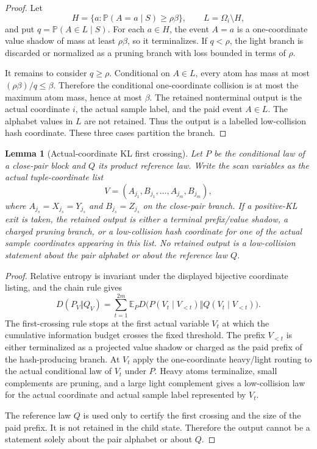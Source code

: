\documentclass[11pt]{article}
\newtheorem{lemma}[theorem]{Lemma}
\theoremstyle{remark}
\newcommand{\E}{\mathbb E}
\newcommand{\Prob}{\mathbb P}
\begin{document}
\begin{proof}
Let
\[
        H=\{a:\Prob(A=a\mid S)\ge \rho\beta\},
        \qquad L=\Omega_i\setminus H,
\]
and put $q=\Prob(A\in L\mid S)$.  For each $a\in H$, the event $A=a$ is a one-coordinate value shadow of mass at least $\rho\beta$, so it terminalizes.  If $q<\rho$, the light branch is discarded or normalized as a pruning branch with loss bounded in terms of $\rho$.

It remains to consider $q\ge\rho$.  Conditional on $A\in L$, every atom has mass at most $(\rho\beta)/q\le \beta$.  Therefore the conditional one-coordinate collision is at most the maximum atom mass, hence at most $\beta$.  The retained nonterminal output is the actual coordinate $i$, the actual sample label, and the paid event $A\in L$.  The alphabet values in $L$ are not retained.  Thus the output is a labelled low-collision hash coordinate.  These three cases partition the branch.
\end{proof}

\begin{lemma}[Actual-coordinate KL first crossing]\label{lem:crit-kl-actual}
Let $P$ be the conditional law of a close-pair block and $Q$ its product reference law.  Write the scan variables as the actual tuple-coordinate list
\[
        V=(A_{j_1},B_{j_1},\ldots,A_{j_m},B_{j_m}),
\]
where $A_{j_s}=X_{j_s}=Y_{j_s}$ and $B_{j_s}=Z_{j_s}$ on the close-pair branch.  If a positive-KL exit is taken, the retained output is either a terminal prefix/value shadow, a charged pruning branch, or a low-collision hash coordinate for one of the actual sample coordinates appearing in this list.  No retained output is a low-collision statement about the pair alphabet or about the reference law $Q$.
\end{lemma}

\begin{proof}
Relative entropy is invariant under the displayed bijective coordinate listing, and the chain rule gives
\[
        D(P_V\Vert Q_V)=\sum_{t=1}^{2m}\E_P D\bigl(P(V_t\mid V_{<t})\Vert Q(V_t\mid V_{<t})\bigr).
\]
The first-crossing rule stops at the first actual variable $V_t$ at which the cumulative information budget crosses the fixed threshold.  The prefix $V_{<t}$ is either terminalized as a projected value shadow or charged as the paid prefix of the hash-producing branch.  At $V_t$ apply the one-coordinate heavy/light routing to the actual conditional law of $V_t$ under $P$.  Heavy atoms terminalize, small complements are pruning, and a large light complement gives a low-collision law for the actual coordinate and actual sample label represented by $V_t$.

The reference law $Q$ is used only to certify the first crossing and the size of the paid prefix.  It is not retained in the child state.  Therefore the output cannot be a statement solely about the pair alphabet or about $Q$.
\end{proof}
\end{document}
